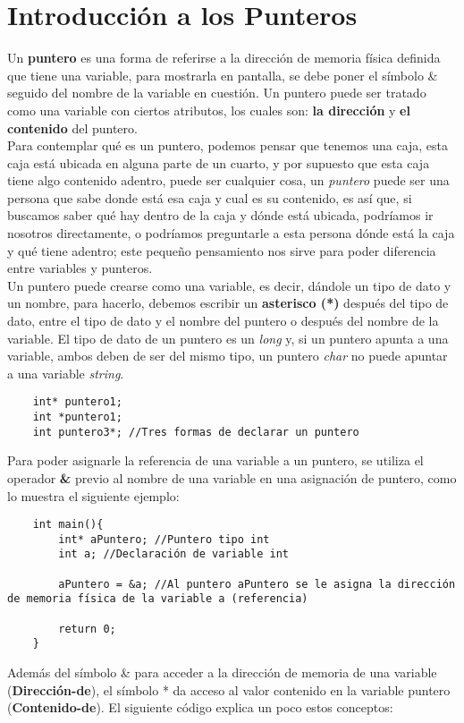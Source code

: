 \section{Introducción a los Punteros}
Un \textbf{puntero} es una forma de referirse a la dirección de memoria física definida que tiene una variable, para mostrarla en pantalla, se debe poner el símbolo \& seguido del nombre de la variable en cuestión. Un puntero puede ser tratado como una variable con ciertos atributos, los cuales son: \textbf{la dirección} y \textbf{el contenido} del puntero.\\
Para contemplar qué es un puntero, podemos pensar que tenemos una caja, esta caja está ubicada en alguna parte de un cuarto, y por supuesto que esta caja tiene algo contenido adentro, puede ser cualquier cosa, un \textit{puntero} puede ser una persona que sabe donde está esa caja y cual es su contenido, es así que, si buscamos saber qué hay dentro de la caja y dónde está ubicada, podríamos ir nosotros directamente, o podríamos preguntarle a esta persona dónde está la caja y qué tiene adentro; este pequeño pensamiento nos sirve para poder diferencia entre variables y punteros.\\
Un puntero puede crearse como una variable, es decir, dándole un tipo de dato y un nombre, para hacerlo, debemos escribir un \textbf{asterisco (*)} después del tipo de dato, entre el tipo de dato y el nombre del puntero o después del nombre de la variable. El tipo de dato de un puntero es un \textit{long} y, si un puntero apunta a una variable, ambos deben de ser del mismo tipo, un puntero \textit{char} no puede apuntar a una variable \textit{string}.
\begin{lstlisting}
    int* puntero1;
    int *puntero1;
    int puntero3*; //Tres formas de declarar un puntero
\end{lstlisting}
Para poder asignarle la referencia de una variable a un puntero, se utiliza el operador \textbf{\&} previo al nombre de una variable en una asignación de puntero, como lo muestra el siguiente ejemplo:
\begin{lstlisting}
    int main(){
        int* aPuntero; //Puntero tipo int
        int a; //Declaración de variable int
        
        aPuntero = &a; //Al puntero aPuntero se le asigna la dirección de memoria física de la variable a (referencia)
    
        return 0;
    }
\end{lstlisting}
Además del símbolo \& para acceder a la dirección de memoria de una variable (\textbf{Dirección-de}), el símbolo * da acceso al valor contenido en la variable puntero (\textbf{Contenido-de}). El siguiente código explica un poco estos conceptos:

